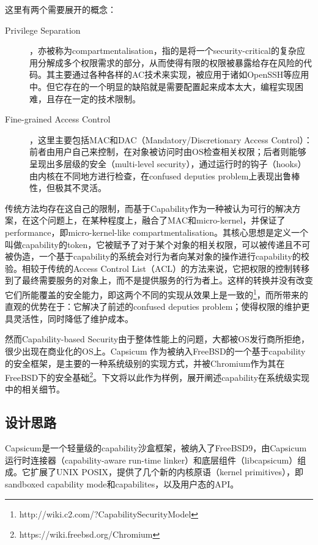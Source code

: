 这里有两个需要展开的概念：
\begin{description}
\item[Privilege Separation]，亦被称为compartmentalisation，指的是将一个security-critical的复杂应用分解成多个权限需求的部分，从而使得有限的权限被暴露给存在风险的代码。其主要通过各种各样的AC技术来实现，被应用于诸如OpenSSH等应用中。但它存在的一个明显的缺陷就是需要配置起来成本太大，编程实现困难，且存在一定的技术限制。

\item[Fine-grained Access Control]，这里主要包括MAC和DAC（Mandatory/Discretionary Access Control）：前者由用户自己来控制，在对象被访问时由OS检查相关权限；后者则能够呈现出多层级的安全（multi-level security），通过运行时的钩子（hooks）由内核在不同地方进行检查，在confused deputies problem上表现出鲁棒性，但极其不灵活。
\end{description}

传统方法均存在这自己的限制，而基于Capability作为一种被认为可行的解决方案，在这个问题上，在某种程度上，融合了MAC和micro-kernel，并保证了performance，即micro-kernel-like compartmentalisation。其核心思想是定义一个叫做capability的token，它被赋予了对于某个对象的相关权限，可以被传递且不可被伪造，一个基于capability的系统会对行为者向某对象的操作进行capability的校验。相较于传统的Access Control List（ACL）的方法来说，它把权限的控制转移到了最终需要服务的对象上，而不是提供服务的行为者上。这样的转换并没有改变它们所能覆盖的安全能力，即这两个不同的实现从效果上是一致的\footnote{http://wiki.c2.com/?CapabilitySecurityModel}，而所带来的直观的优势在于：它解决了前述的confused deputies problem；使得权限的维护更具灵活性，同时降低了维护成本。

然而Capability-based Security由于整体性能上的问题，大都被OS发行商所拒绝，很少出现在商业化的OS上。Capsicum \parencite{capsicum} 作为被纳入FreeBSD的一个基于capability的安全框架，是主要的一种系统级别的实现方式，并被Chromium作为其在FreeBSD下的安全基础\footnote{https://wiki.freebsd.org/Chromium}。下文将以此作为样例，展开阐述capability在系统级实现中的相关细节。

\subsection{设计思路}
\label{sss:design}

Capsicum是一个轻量级的capability沙盒框架，被纳入了FreeBSD9，由Capsicum运行时连接器（capability-aware run-time linker）和底层组件（libcapsicum）组成。它扩展了UNIX POSIX，提供了几个新的内核原语（kernel primitives），即sandboxed capability mode和capabilites，以及用户态的API。

